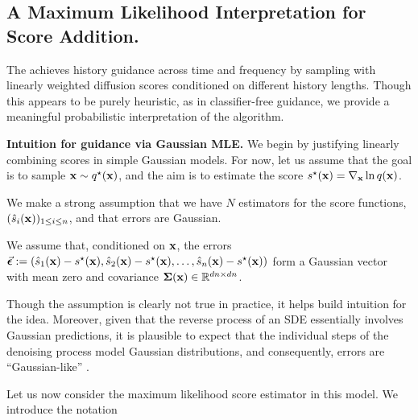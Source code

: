 \subsection{A Maximum Likelihood Interpretation for Score Addition.}
\label{appendix:add_score}
The \method achieves history guidance across time and frequency by sampling with linearly weighted diffusion scores conditioned on different history lengths. Though this appears to be purely heuristic, as in classifier-free guidance, we provide a meaningful probabilistic interpretation of the algorithm. 

\textbf{Intuition for guidance via Gaussian MLE.} We begin by justifying linearly combining scores in simple Gaussian models. For now, let us assume that the goal is to sample ${\mathbf{x}} \sim q^\star({\mathbf{x}})$, and the aim is to estimate the score $s^\star({\mathbf{x}}) = \nabla_{{\mathbf{x}}} \ln q({\mathbf{x}})$. 

\newcommand{\veceps}{\vec{\bm{\epsilon}}}
We make a strong assumption that we have $N$ estimators for the score functions, $(\hat s_i({\mathbf{x}}))_{1 \le i \le n}$, and that errors are Gaussian. %
\begin{assumption} We assume that, conditioned on ${\mathbf{x}}$, the errors $\veceps := (\hat s_1(\bx) - s^\star(\bx), \hat s_2(\bx) - s^\star(\bx), \dots, \hat s_n(\bx) - s^\star(\bx))$ form a Gaussian vector with mean zero and covariance $\bm{\Sigma}({\mathbf{x}}) \in \mathbb{R}^{dn \times dn}$.    
\end{assumption}
Though the assumption is clearly not true in practice, it helps build intuition for the idea. Moreover, given that the reverse process of an SDE essentially involves Gaussian predictions, it is plausible to expect that the individual steps of the denoising process model Gaussian distributions, and consequently, errors are ``Gaussian-like'' \cite{huang2023diffusion} .


\newcommand{\smle}{\hat s^{\textsc{mle}}}
\newcommand{\argmax}{\mathrm{argmax}}
Let us now consider the maximum likelihood score estimator in this model. We introduce the notation 

